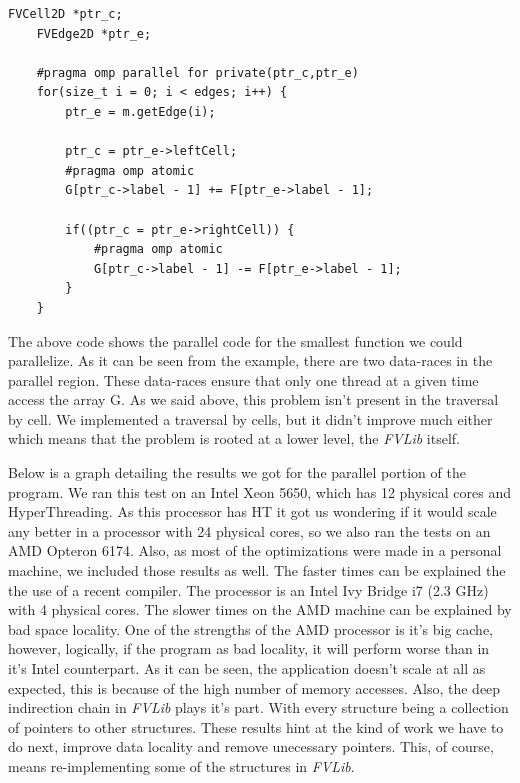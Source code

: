 \documentclass[a4paper,10pt,openright,openbib,twocolumn]{article}
\begin{document}
\begin{minipage}{.45\textwidth}
\lstset{
    language=C++,
    basicstyle=\ttfamily\small,
    breaklines=true
}
\begin{lstlisting}[caption=Parallel part of makeFlux]    
    FVCell2D *ptr_c;     
    FVEdge2D *ptr_e;
    
    #pragma omp parallel for private(ptr_c,ptr_e)
    for(size_t i = 0; i < edges; i++) {        
        ptr_e = m.getEdge(i);
                
        ptr_c = ptr_e->leftCell;   
        #pragma omp atomic 
        G[ptr_c->label - 1] += F[ptr_e->label - 1];
        
        if((ptr_c = ptr_e->rightCell)) {
            #pragma omp atomic               
            G[ptr_c->label - 1] -= F[ptr_e->label - 1];    
        }        
    } 
\end{lstlisting}
\end{minipage} 

The above code shows the parallel code for the smallest function we could parallelize. As it can be seen from the example, there are two data-races in the parallel region. These data-races ensure that only one thread at a given time access the array G. As we said above, this problem isn't present in the traversal by cell. We implemented a traversal by cells, but it didn't improve much either which means that the problem is rooted at a lower level, the \emph{FVLib} itself. 

Below is a graph detailing the results we got for the parallel portion of the program. We ran this test on an Intel Xeon 5650, which has 12 physical cores and HyperThreading. As this processor has HT it got us wondering if it would scale any better in a processor with 24 physical cores, so we also ran the tests on an AMD Opteron 6174. Also, as most of the optimizations were made in a personal machine, we included those results as well. The faster times can be explained the the use of a recent compiler. The processor is an Intel Ivy Bridge i7 (2.3 GHz) with 4 physical cores. The slower times on the AMD machine can be explained by bad space locality. One of the strengths of the AMD processor is it's big cache, however, logically, if the program as bad locality, it will perform worse than in it's Intel counterpart. 
As it can be seen, the application doesn't scale at all as expected, this is because of the high number of memory accesses. Also, the deep indirection chain in \emph{FVLib} plays it's part. With every structure being a collection of pointers to other structures. These results hint at the kind of work we have to do next, improve data locality and remove unecessary pointers. This, of course, means re-implementing some of the structures in \emph{FVLib}.
\end{document}
